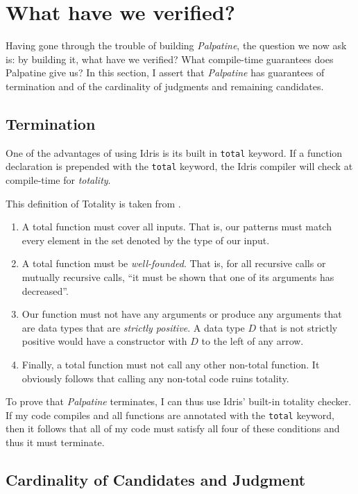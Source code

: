 \chapter{What have we verified?}

Having gone through the trouble of building \textit{Palpatine}, the question we
now ask is: by building it, what have we verified? What compile-time guarantees
does Palpatine give us? In this section, I assert that \textit{Palpatine} has
guarantees of termination and of the cardinality of judgments and remaining
candidates. 

\section{Termination}

One of the advantages of using Idris is its built in \texttt{total} keyword. If
a function declaration is prepended with the \texttt{total} keyword, the Idris
compiler will check at compile-time for \textit{totality}. 

This definition of Totality is taken from \cite{tdd_book}. 
\begin{enumerate}
    \item A total function must cover all inputs. That is, our patterns must
    match every element in the set denoted by the type of our input.
    \item A total function must be \textit{well-founded}. That is, for all
    recursive calls or mutually recursive calls, ``it must be shown that one of
    its arguments has decreased''. 
    \item Our function must not have any arguments or produce any arguments that
    are data types that are \textit{strictly positive}. A data type $D$ that is
    not strictly positive would have a constructor with $D$ to the left of any
    arrow. 
    \item Finally, a total function must not call any other non-total function.
    It obviously follows that calling any non-total code ruins totality. 
\end{enumerate}

To prove that \textit{Palpatine} terminates, I can thus use Idris' built-in
totality checker. If my code compiles and all functions are annotated with the
\texttt{total} keyword, then it follows that all of my code must satisfy all
four of these conditions and thus it must terminate. 

\section{Cardinality of Candidates and Judgment}

